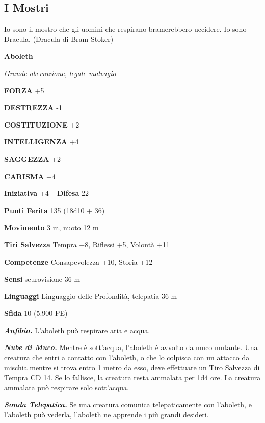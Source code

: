 \pagebreak
\subsection{I Mostri}

\begin{tcolorbox}[enhanced,arc=5pt,boxrule=0.3pt]{Io sono il mostro che gli uomini che respirano bramerebbero uccidere. Io sono Dracula. (Dracula di Bram Stoker)}\end{tcolorbox}\medskip

\bigskip

\begin{multicols}{2}

\medskip{}\textbf{Aboleth}

\emph{Grande aberrazione, legale malvagio}

\textbf{FORZA} +5

\textbf{DESTREZZA} -1

\textbf{COSTITUZIONE} +2

\textbf{INTELLIGENZA} +4

\textbf{SAGGEZZA} +2

\textbf{CARISMA} +4

\textbf{Iniziativa} +4 -- \textbf{Difesa} 22

\textbf{Punti Ferita} 135 (18d10 + 36)

\textbf{Movimento} 3 m, nuoto 12 m

\textbf{Tiri Salvezza} Tempra +8, Riflessi +5, Volontà +11

\textbf{Competenze} Consapevolezza +10, Storia +12

\textbf{Sensi} scurovisione 36 m

\textbf{Linguaggi} Linguaggio delle Profondità, telepatia 36 m

\textbf{Sfida} 10 (5.900 PE)

\emph{\textbf{Anfibio.}} L'aboleth può respirare aria e acqua.

\emph{\textbf{Nube di Muco.}} Mentre è sott'acqua, l'aboleth è avvolto da muco mutante. Una creatura che entri a contatto con l'aboleth, o che lo colpisca con un attacco da mischia mentre si trova entro 1 metro da esso, deve effettuare un Tiro Salvezza di Tempra CD 14. Se lo fallisce, la creatura resta ammalata per 1d4 ore. La creatura ammalata può respirare solo sott'acqua.

\emph{\textbf{Sonda Telepatica.}} Se una creatura comunica telepaticamente con l'aboleth, e l'aboleth può vederla, l'aboleth ne apprende i più grandi desideri.


\end{multicols}
